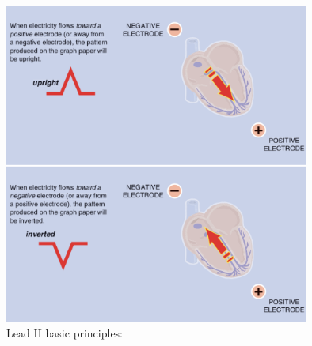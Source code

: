 \documentclass[LaM,binding=0.6cm]{sapthesis}
\begin{document}
\begin{figure}[H]  \centering
    \includegraphics[width=100mm,scale=0.7]{ruleflow}
    \caption{Lead II basic principles: \cite{ecgbook}}
    \label{fig:ruleflow}
\end{figure}
\end{document}

